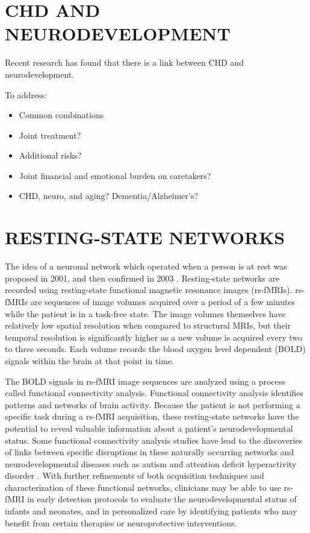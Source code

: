 \section{CHD AND NEURODEVELOPMENT}

Recent research has found that there is a link between CHD and neurodevelopment.

To address:
\begin{itemize}
\item Common combinations
\item Joint treatment?
\item Additional risks?
\item Joint financial and emotional burden on caretakers? 
\item CHD, neuro, and aging? Dementia/Alzheimer's?
\end{itemize}

\section{RESTING-STATE NETWORKS}

The idea of a neuronal network which operated when a person is at rest was proposed in 2001, and then confirmed in 2003 \cite{Raichle2001} \cite{Greicius2003}. Resting-state networks are recorded using resting-state functional magnetic resonance images (rs-fMRIs). rs-fMRIs are sequences of image volumes acquired over a period of a few minutes while the patient is in a task-free state. The image volumes themselves have relatively low spatial resolution when compared to structural MRIs, but their temporal resolution is significantly higher as a new volume is acquired every two to three seconds. Each volume records the blood oxygen level dependent (BOLD) signals within the brain at that point in time. 

The BOLD signals in rs-fMRI image sequences are analyzed using a process called functional connectivity analysis. Functional connectivity analysis identifies patterns and networks of brain activity. Because the patient is not performing a specific task during a rs-fMRI acquisition, these resting-state networks have the potential to reveal valuable information about a patient's neurodevelopmental status. Some functional connectivity analysis studies have lead to the discoveries of links between specific disruptions in these naturally occurring networks and neurodevelopmental diseases such as autism and attention deficit hyperactivity disorder \cite{Assaf2010} \cite{Zang2007}. With further refinements of both acquisition techniques and characterization of these functional networks, clinicians may be able to use rs-fMRI in early detection protocols to evaluate the neurodevelopmental status of infants and neonates, and in personalized care by identifying patients who may benefit from certain therapies or neuroprotective interventions.


